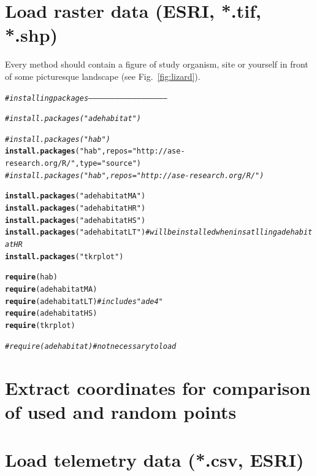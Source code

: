 \documentclass[11pt, a4paper]{article}\usepackage[]{graphicx}\usepackage[]{color}
\makeatletter
\newcommand{\hlstr}[1]{\textcolor[rgb]{0.192,0.494,0.8}{#1}}%
\newcommand{\hlcom}[1]{\textcolor[rgb]{0.678,0.584,0.686}{\textit{#1}}}%
\newcommand{\hlstd}[1]{\textcolor[rgb]{0.345,0.345,0.345}{#1}}%
\newcommand{\hlkwc}[1]{\textcolor[rgb]{0.333,0.667,0.333}{#1}}%
\newcommand{\hlkwd}[1]{\textcolor[rgb]{0.737,0.353,0.396}{\textbf{#1}}}%
\newenvironment{kframe}{%
 \def\at@end@of@kframe{}%
 \ifinner\ifhmode%
  \def\at@end@of@kframe{\end{minipage}}%
  \begin{minipage}{\columnwidth}%
 \fi\fi%
 \def\FrameCommand##1{\hskip\@totalleftmargin \hskip-\fboxsep
 \colorbox{shadecolor}{##1}\hskip-\fboxsep
     \hskip-\linewidth \hskip-\@totalleftmargin \hskip\columnwidth}%
 \MakeFramed {\advance\hsize-\width
   \@totalleftmargin\z@ \linewidth\hsize
   \@setminipage}}%
 {\par\unskip\endMakeFramed%
 \at@end@of@kframe}
\newenvironment{knitrout}{}{} %
\makeatother
\begin{document}
\section{Load raster data (ESRI, *.tif, *.shp)}%

Every method should contain a figure of study organism, site or yourself in front of some picturesque landscape (see Fig.~\ref{fig:lizard}).

\begin{knitrout}
\color{fgcolor}\begin{kframe}
\begin{alltt}
\hlcom{# installing packages -----------------------------------------------------}

\hlcom{# install.packages("adehabitat")}

\hlcom{# install.packages("hab")}
\hlkwd{install.packages}\hlstd{(}\hlstr{"hab"}\hlstd{,} \hlkwc{repos} \hlstd{=} \hlstr{"http://ase-research.org/R/"}\hlstd{,} \hlkwc{type} \hlstd{=} \hlstr{"source"}\hlstd{)}
\hlcom{# install.packages("hab", repos = "http://ase-research.org/R/")}

\hlkwd{install.packages}\hlstd{(}\hlstr{"adehabitatMA"}\hlstd{)}
\hlkwd{install.packages}\hlstd{(}\hlstr{"adehabitatHR"}\hlstd{)}
\hlkwd{install.packages}\hlstd{(}\hlstr{"adehabitatHS"}\hlstd{)}
\hlkwd{install.packages}\hlstd{(}\hlstr{"adehabitatLT"}\hlstd{)} \hlcom{# will be installed when insatlling adehabitatHR}
\hlkwd{install.packages}\hlstd{(}\hlstr{"tkrplot"}\hlstd{)}


\hlkwd{require}\hlstd{(hab)}
\hlkwd{require}\hlstd{(adehabitatMA)}
\hlkwd{require}\hlstd{(adehabitatLT)}  \hlcom{# includes "ade4"}
\hlkwd{require}\hlstd{(adehabitatHS)}
\hlkwd{require}\hlstd{(tkrplot)}

\hlcom{# require(adehabitat)  # not necessary to load}
\end{alltt}
\end{kframe}
\end{knitrout}


\section{Extract coordinates for comparison of used and random points} %


\section{Load telemetry data (*.csv, ESRI)}%
\end{document}
